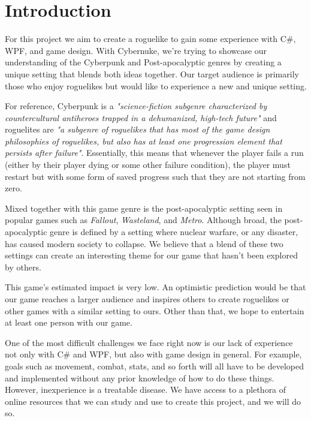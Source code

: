 \documentclass[10pt,conference,onecolumn,compsoc]{IEEEtran}
\begin{document}
\IEEEdisplaynontitleabstractindextext
\IEEEpeerreviewmaketitle



\section{Introduction}

For this project we aim to create a roguelike to gain some experience with C\#, WPF, and game design. With Cybernuke, we're trying to showcase our understanding of the Cyberpunk and Post-apocalyptic genres by creating a unique setting that blends both ideas together. Our target audience is primarily those who enjoy roguelikes but would like to experience a new  and unique setting. 

For reference, Cyberpunk is a \emph{"science-fiction subgenre characterized by countercultural antiheroes trapped in a dehumanized, high-tech future"}\cite{IEEEhowto:cyberpunk} and roguelites are \emph{"a subgenre of roguelikes that has most of the game design philosophies of roguelikes, but also has at least one progression element that persists after failure"}\cite{IEEEhowto:roguelite}. Essentially, this means that whenever the player fails a run (either by their player dying or some other failure condition), the player must restart but with some form of saved progress such that they are not starting from zero. 

Mixed together with this game genre is the post-apocalyptic setting seen in popular games such as \emph{Fallout}, \emph{Wasteland}, and \emph{Metro}. Although broad, the post-apocalyptic genre is defined by a setting where nuclear warfare, or any disaster, has caused modern society to collapse. We believe that a blend of these two settings can create an interesting theme for our game that hasn't been explored by others.

This game's estimated impact is very low. An optimistic prediction would be that our game reaches a larger audience and inspires others to create roguelikes or other games with a similar setting to ours. Other than that, we hope to entertain at least one person with our game.

One of the most difficult challenges we face right now is our lack of experience not only with C\# and WPF, but also with game design in general. For example, goals such as movement, combat, stats, and so forth will all have to be developed and implemented without any prior knowledge of how to do these things. However, inexperience is a treatable disease. We have access to a plethora of online resources that we can study and use to create this project, and we will do so. 
\end{document}
